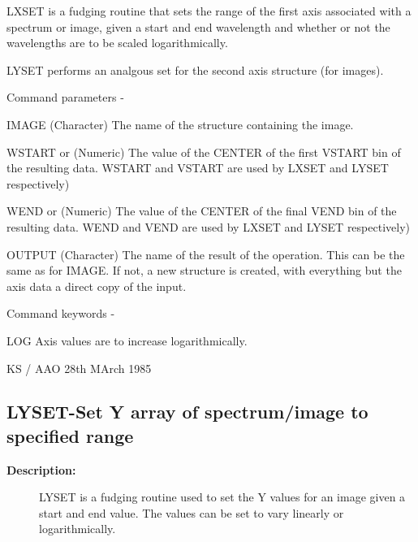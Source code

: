 \begin{description}
\begin{description}
\begin{terminalv}
 LXSET is a fudging routine that sets the range of the first axis
 associated with a spectrum or image, given a start and end wavelength and
 whether or not the wavelengths are to be scaled logarithmically.

 LYSET performs an analgous set for the second axis structure
 (for images).

 Command parameters -

 IMAGE      (Character) The name of the structure containing the image.

 WSTART or  (Numeric) The value of the CENTER of the first
 VSTART      bin of the resulting data. WSTART and VSTART are used
             by  LXSET and LYSET respectively)

 WEND  or   (Numeric) The value of the CENTER of the final
 VEND        bin of the resulting data. WEND and VEND are used
             by  LXSET and LYSET respectively)

 OUTPUT     (Character) The name of the result of the operation.
            This can be the same as for IMAGE.  If not, a new structure
            is created, with everything but the axis data a direct
            copy of the input.

 Command keywords -

 LOG    Axis values are to increase logarithmically.

                                  KS / AAO 28th MArch 1985
\end{terminalv}
\end{description}
\subsection{LYSET-\label{LYSET}Set Y array of spectrum/image to specified range}
\begin{description}

\item [\textbf{Description:}]
 LYSET is a fudging routine used to set the Y values for an image
 given a start and end value.  The values can be set
 to vary linearly or logarithmically.


\end{description}
\end{description}

